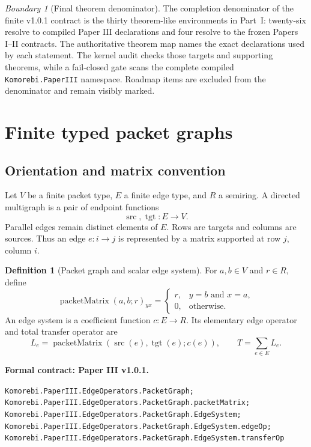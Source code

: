 \documentclass[11pt,a4paper]{article}
\theoremstyle{plain}
\theoremstyle{definition}
\newtheorem{definition}[definition]{Definition}
\theoremstyle{remark}
\newtheorem{boundary}[boundary]{Boundary}
\newcommand{\src}{\operatorname{src}}
\newcommand{\tgt}{\operatorname{tgt}}
\newcommand{\leanname}[1]{\nolinkurl{#1}}
\newcommand{\statusleanthree}[1]{\par\smallskip\noindent\begin{minipage}{\linewidth}{\color{leanblue}\textbf{Formal contract: Paper III v1.0.1.}}\par\begingroup\small\raggedright\leanname{#1}\par\endgroup\end{minipage}\par\smallskip}
\begin{document}
\begin{boundary}[Final theorem denominator]
The completion denominator of the finite v1.0.1 contract is the thirty theorem-like environments in Part~I: twenty-six resolve to compiled Paper III declarations and four resolve
to the frozen Papers I--II contracts.  The authoritative theorem map names the
exact declarations used by each statement.  The kernel audit checks those
targets and supporting theorems, while a fail-closed gate scans the complete
compiled \leanname{Komorebi.PaperIII} namespace.  Roadmap items are excluded
from the denominator and remain visibly marked.
\end{boundary}

\section{Finite typed packet graphs}
\label{sec:edge-operators}

\subsection{Orientation and matrix convention}

Let $V$ be a finite packet type, $E$ a finite edge type, and $R$ a semiring.
A directed multigraph is a pair of endpoint functions
\[
  \src,\tgt:E\longrightarrow V.
\]
Parallel edges remain distinct elements of $E$.  Rows are targets and columns
are sources.  Thus an edge $e:i\to j$ is represented by a matrix supported at
row $j$, column $i$.

\begin{definition}[Packet graph and scalar edge system]
\label{def:edge-system}
For $a,b\in V$ and $r\in R$, define
\[
  \operatorname{packetMatrix}(a,b;r)_{yx}
  =
  \begin{cases}
  r,&y=b\text{ and }x=a,\\
  0,&\text{otherwise}.
  \end{cases}
\]
An edge system is a coefficient function $c:E\to R$.  Its elementary edge
operator and total transfer operator are
\[
  L_e=\operatorname{packetMatrix}(\src(e),\tgt(e);c(e)),
  \qquad
  T=\sum_{e\in E}L_e.
\]
\end{definition}
\statusleanthree{Komorebi.PaperIII.EdgeOperators.PacketGraph; Komorebi.PaperIII.EdgeOperators.PacketGraph.packetMatrix; Komorebi.PaperIII.EdgeOperators.PacketGraph.EdgeSystem; Komorebi.PaperIII.EdgeOperators.PacketGraph.EdgeSystem.edgeOp; Komorebi.PaperIII.EdgeOperators.PacketGraph.EdgeSystem.transferOp}
\end{document}
